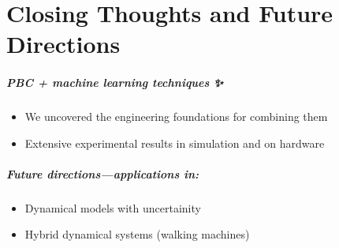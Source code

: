 \documentclass[
]{report}
\let\oldsubparagraph\subparagraph
\renewcommand{\subparagraph}[1]{\oldsubparagraph{#1}\mbox{}}
\providecommand{\tightlist}{%
  \setlength{\itemsep}{0pt}\setlength{\parskip}{0pt}}\usepackage{longtable,booktabs,array}
\begin{document}
\hypertarget{closing-thoughts-and-future-directions}{%
\section{Closing Thoughts and Future
Directions}\label{closing-thoughts-and-future-directions}}

\hypertarget{pbc-machine-learning-techniques}{%
\subparagraph{\texorpdfstring{PBC + machine learning techniques
{✨}}{PBC + machine learning techniques ✨}}\label{pbc-machine-learning-techniques}}

\begin{itemize}
\tightlist
\item
  We uncovered the engineering foundations for combining them
\item
  Extensive experimental results in simulation and on hardware
\end{itemize}

\hypertarget{future-directionsapplications-in}{%
\subparagraph{Future directions---applications
in:}\label{future-directionsapplications-in}}

\begin{itemize}
\tightlist
\item
  Dynamical models with uncertainity
\item
  Hybrid dynamical systems (walking machines)
\end{itemize}

\hypertarget{section}{%
\section{}\label{section}}
\end{document}
